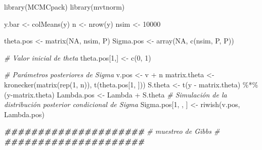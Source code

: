 \documentclass[
  10pt,
  spanish,
]{book}
\newenvironment{Shaded}{\begin{snugshade}}{\end{snugshade}}
\newcommand{\CommentTok}[1]{\textcolor[rgb]{0.56,0.35,0.01}{\textit{#1}}}
\newcommand{\ConstantTok}[1]{\textcolor[rgb]{0.00,0.00,0.00}{#1}}
\newcommand{\DecValTok}[1]{\textcolor[rgb]{0.00,0.00,0.81}{#1}}
\newcommand{\DocumentationTok}[1]{\textcolor[rgb]{0.56,0.35,0.01}{\textbf{\textit{#1}}}}
\newcommand{\FunctionTok}[1]{\textcolor[rgb]{0.00,0.00,0.00}{#1}}
\newcommand{\NormalTok}[1]{#1}
\newcommand{\OtherTok}[1]{\textcolor[rgb]{0.56,0.35,0.01}{#1}}
\newcommand{\SpecialCharTok}[1]{\textcolor[rgb]{0.00,0.00,0.00}{#1}}
\theoremstyle{definition}
\theoremstyle{definition}
\theoremstyle{definition}
\theoremstyle{definition}
\theoremstyle{remark}
\begin{document}
\begin{Shaded}
\begin{Highlighting}[]
\FunctionTok{library}\NormalTok{(MCMCpack)}
\FunctionTok{library}\NormalTok{(mvtnorm)}

\NormalTok{y.bar }\OtherTok{\textless{}{-}} \FunctionTok{colMeans}\NormalTok{(y)}
\NormalTok{n }\OtherTok{\textless{}{-}} \FunctionTok{nrow}\NormalTok{(y)}
\NormalTok{nsim }\OtherTok{\textless{}{-}} \DecValTok{10000}

\NormalTok{theta.pos }\OtherTok{\textless{}{-}} \FunctionTok{matrix}\NormalTok{(}\ConstantTok{NA}\NormalTok{, nsim, P)}
\NormalTok{Sigma.pos }\OtherTok{\textless{}{-}} \FunctionTok{array}\NormalTok{(}\ConstantTok{NA}\NormalTok{, }\FunctionTok{c}\NormalTok{(nsim, P, P))}

\CommentTok{\# Valor inicial de theta}
\NormalTok{theta.pos[}\DecValTok{1}\NormalTok{,] }\OtherTok{\textless{}{-}} \FunctionTok{c}\NormalTok{(}\DecValTok{0}\NormalTok{, }\DecValTok{1}\NormalTok{)}

\CommentTok{\# Parámetros posteriores de Sigma}
\NormalTok{v.pos }\OtherTok{\textless{}{-}}\NormalTok{ v }\SpecialCharTok{+}\NormalTok{ n}
\NormalTok{matrix.theta }\OtherTok{\textless{}{-}} \FunctionTok{kronecker}\NormalTok{(}\FunctionTok{matrix}\NormalTok{(}\FunctionTok{rep}\NormalTok{(}\DecValTok{1}\NormalTok{, n)),}
                          \FunctionTok{t}\NormalTok{(theta.pos[}\DecValTok{1}\NormalTok{, ])) }
\NormalTok{S.theta }\OtherTok{\textless{}{-}} \FunctionTok{t}\NormalTok{(y }\SpecialCharTok{{-}}\NormalTok{ matrix.theta) }\SpecialCharTok{\%*\%}\NormalTok{ (y}\SpecialCharTok{{-}}\NormalTok{matrix.theta)}
\NormalTok{Lambda.pos }\OtherTok{\textless{}{-}}\NormalTok{ Lambda }\SpecialCharTok{+}\NormalTok{ S.theta}
\CommentTok{\# Simulación de la distribución posterior condicional de Sigma}
\NormalTok{Sigma.pos[}\DecValTok{1}\NormalTok{, , ] }\OtherTok{\textless{}{-}} \FunctionTok{riwish}\NormalTok{(v.pos, Lambda.pos)}

\DocumentationTok{\#\#\#\#\#\#\#\#\#\#\#\#\#\#\#\#\#\#\#\#\#}
\CommentTok{\# muestreo de Gibbs \#}
\DocumentationTok{\#\#\#\#\#\#\#\#\#\#\#\#\#\#\#\#\#\#\#\#\#}


\end{Highlighting}
\end{Shaded}
\end{document}
